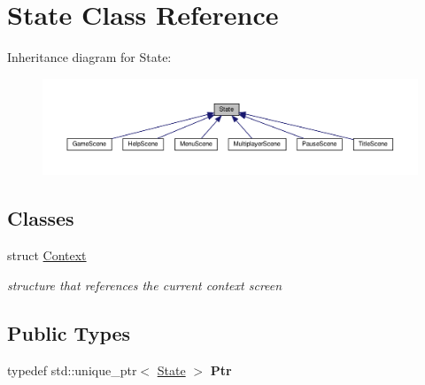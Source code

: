 \hypertarget{classState}{}\section{State Class Reference}
\label{classState}


Inheritance diagram for State\+:
\nopagebreak
\begin{figure}[H]
\begin{center}
\leavevmode
\includegraphics[width=350pt]{classState__inherit__graph}
\end{center}
\end{figure}
\subsection*{Classes}
\begin{DoxyCompactItemize}
\item 
struct \hyperlink{structState_1_1Context}{Context}
\begin{DoxyCompactList}\small\item\em structure that references the current context screen \end{DoxyCompactList}\end{DoxyCompactItemize}
\subsection*{Public Types}
\begin{DoxyCompactItemize}
\item 
\mbox{\label{classState_a71d9930be1a58be7f711e245b7965d48}} 
typedef std\+::unique\+\_\+ptr$<$ \hyperlink{classState}{State} $>$ {\bfseries Ptr}
\end{DoxyCompactItemize}
